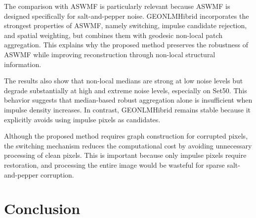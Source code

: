 \documentclass{ieeeaccess}
\begin{document}
The comparison with ASWMF is particularly relevant because ASWMF is designed specifically for salt-and-pepper noise. GEONLMHibrid incorporates the strongest properties of ASWMF, namely switching, impulse candidate rejection, and spatial weighting, but combines them with geodesic non-local patch aggregation. This explains why the proposed method preserves the robustness of ASWMF while improving reconstruction through non-local structural information.

The results also show that non-local medians are strong at low noise levels but degrade substantially at high and extreme noise levels, especially on Set50. This behavior suggests that median-based robust aggregation alone is insufficient when impulse density increases. In contrast, GEONLMHibrid remains stable because it explicitly avoids using impulse pixels as candidates.

Although the proposed method requires graph construction for corrupted pixels, the switching mechanism reduces the computational cost by avoiding unnecessary processing of clean pixels. This is important because only impulse pixels require restoration, and processing the entire image would be wasteful for sparse salt-and-pepper corruption.

\section{Conclusion}
\label{sec:conclusion}
\end{document}
